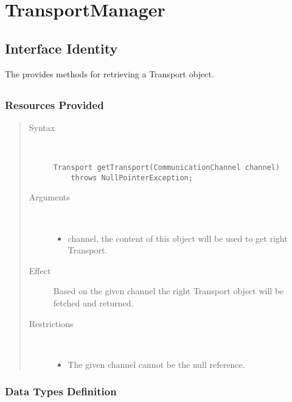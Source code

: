 \section{TransportManager}
\label{api:notification-unit-transport-manager}

\subsection{Interface Identity}

\npar The  provides methods for retrieving a
Transport object.

\subsection{}

\subsubsection{Resources Provided}

\begin{quote}
	\begin{description}
		\item[Syntax] \
		\begin{verbatim}
Transport getTransport(CommunicationChannel channel)
    throws NullPointerException;
		\end{verbatim}
		\item[Arguments] \
		\begin{itemize}
		  \item channel, the content of this object will be used to get right
		  Transport.
		\end{itemize}
		\item[Effect] Based on the given channel the right Transport object will be
		fetched and returned. 
		\item[Restrictions] \
		\begin{itemize}
		  \item The given channel cannot be the null reference. 
		\end{itemize}
	\end{description} 
\end{quote}

\subsubsection{Data Types Definition}


